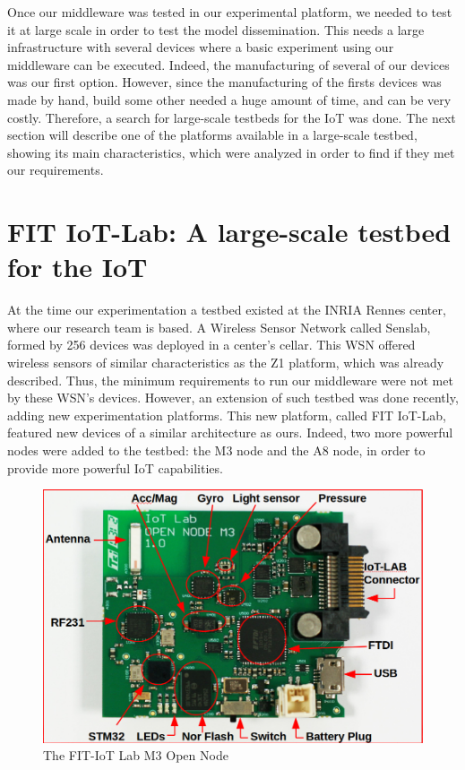 Once our middleware was tested in our experimental platform, we needed to test it at large scale in order to test the model dissemination.
This needs a large infrastructure with several devices where a basic experiment using our middleware can be executed.
Indeed, the manufacturing of several of our devices was our first option.
However, since the manufacturing of the firsts devices was made by hand, build some other needed a huge amount of time, and can be very costly.
Therefore, a search for large-scale testbeds for the IoT was done.
The next section will describe one of the platforms available in a large-scale testbed, showing its main characteristics, which were analyzed in order to find if they met our requirements.

\section*{FIT IoT-Lab: A large-scale testbed for the IoT}
\label{sec:iotlab}
At the time our experimentation a testbed existed at the INRIA Rennes center, where our research team is based.
A Wireless Sensor Network called Senslab\cite{des2011senslab}, formed by 256 devices was deployed in a center's cellar.
This WSN offered wireless sensors of similar characteristics as the Z1 platform, which was already described.
Thus, the minimum requirements to run our middleware were not met by these WSN's devices.
However, an extension of such testbed was done recently, adding new experimentation platforms.
This new platform, called FIT IoT-Lab\cite{Fleury15iotlab}, featured new devices of a similar architecture as ours.
Indeed, two more powerful nodes were added to the testbed: the M3 node and the A8 node, in order to provide more powerful IoT capabilities.

\begin{figure}[htb]
	\centering
	\includegraphics[width=0.7\columnwidth]{chapters/modelsAtRuntimeContiki.images/m3opennode.png}
	\caption{The FIT-IoT Lab M3 Open Node} \label{fig:M3OpenNode}
\end{figure}

